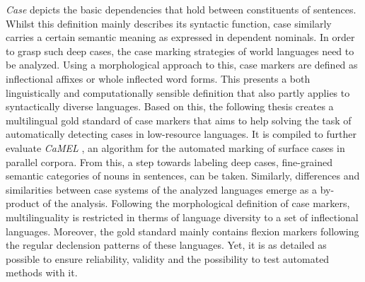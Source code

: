 \documentclass[11pt,a4paper,twoside,openright]{scrbook}
\begin{document}
\deckblatt

\pagestyle{scrheadings}



\erklaerung



\thispagestyle{scrplain}
\noindent


\textit{Case} depicts the basic dependencies that hold between constituents of sentences. Whilst this definition mainly describes its syntactic function, case similarly carries a certain semantic meaning as expressed in dependent nominals. In order to grasp such deep cases, the case marking strategies of world languages need to be analyzed. Using a morphological approach to this, case markers are defined as inflectional affixes or whole inflected word forms. This presents a both linguistically and computationally sensible definition that also partly applies to syntactically diverse languages. Based on this, the following thesis creates a multilingual gold standard of case markers that aims to help solving the task of automatically detecting cases in low-resource languages. It is compiled to further evaluate \textit{CaMEL} \citep{weissweiler2022camel}, an algorithm for the automated marking of surface cases in parallel corpora. From this, a step towards labeling deep cases, fine-grained semantic categories of nouns in sentences, can be taken. Similarly, differences and similarities between case systems of the analyzed languages emerge as a by-product of the analysis. Following the morphological definition of case markers, multilinguality is restricted in therms of language diversity to a set of inflectional languages. Moreover, the gold standard mainly contains flexion markers following the regular declension patterns of these languages. Yet, it is as detailed as possible to ensure reliability, validity and the possibility to test automated methods with it. \\
\end{document}

